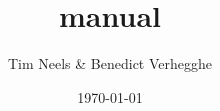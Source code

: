 \documentclass[a4paper]{manual}
\title{\pyformex manual}
\author{Tim Neels \& Benedict Verhegghe}
\date{\today{}}
\begin{document}
\maketitle
\thispagestyle{empty}
\begin{latexonly}
  \tableofcontents
\end{latexonly}
\upshape    %









\appendix


\end{document}
